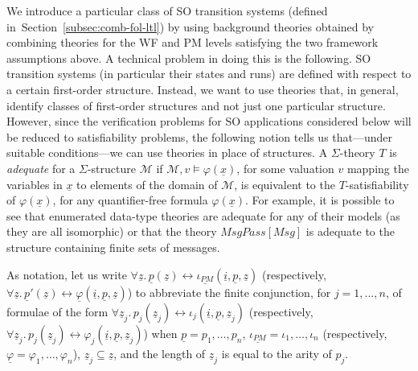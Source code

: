 \documentclass[conference]{IEEEtran}
\newcommand{\secref}[1]{Section~\ref{#1}}
\begin{document}
We introduce a particular class of SO transition systems (defined
in~\secref{subsec:comb-fol-ltl}) by using background theories obtained
by combining theories for the WF and PM levels satisfying the two
framework assumptions above.  A technical problem in doing this is the
following.  SO transition systems (in particular their states and
runs) are defined with respect to a certain first-order structure.  Instead,
we want to use theories that, in general, identify classes of
first-order structures and not just one particular structure.
However, since the verification problems for SO applications
considered below will be reduced to satisfiability problems, the
following notion tells us that---under suitable conditions---we can
use theories in place of structures.  A $\Sigma$-theory $T$ is
\emph{adequate} for a $\Sigma$-structure $\mathcal{M}$ if 
$\mathcal{M}, v\models \varphi(\underline{x})$, for some valuation $v$
mapping the variables in $\underline{x}$ to elements of the domain of
$\mathcal{M}$, is equivalent to the $T$-satisfiability of
$\varphi(\underline{x})$, for any quantifier-free formula
$\varphi(\underline{x})$.  For example, it is possible to see that
enumerated data-type theories are adequate for any of their models (as
they are all isomorphic) or that the theory
$\mathit{MsgPass}[\mathit{Msg}]$ is adequate to the structure
containing finite sets of messages.  

As notation, let us write $\forall \underline{z}.\, \underline{p}(\underline{z}) \leftrightarrow \underline{\iota_{PM}}(\underline{i}, \underline{p}, \underline{z})$ (respectively, $\forall \underline{z}.\, \underline{p}'(\underline{z}) \leftrightarrow \underline{\varphi}(\underline{i}, \underline{p}, \underline{z})$) to abbreviate the finite conjunction, for $j=1,...,n$, of formulae of the form $\forall \underline{z}_j.\, p_j(\underline{z}_j) \leftrightarrow
 \iota_j(\underline{i},\underline{p},\underline{z}_j)$ (respectively, $\forall \underline{z}_j.\, p_j(\underline{z}_j)
 \leftrightarrow \varphi_j(\underline{i},\underline{p},\underline{z}_j)$) when $\underline{p} = p_1, \ldots, p_n$, $\underline{\iota_{PM}} = \iota_1, \ldots, \iota_n$ (respectively, $\underline{\varphi} = \varphi_1, \ldots, \varphi_n$), $\underline{z}_j\subseteq \underline{z}$, and the length of $\underline{z}_j$ is equal to the arity of $p_j$.
  
\end{document}
